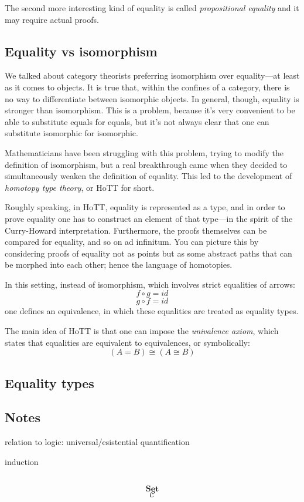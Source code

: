 \documentclass[DaoFP]{subfiles}
\begin{document}
The second more interesting kind of equality is called \emph{propositional equality} and it may require actual proofs. 

\subsection{Equality vs isomorphism}

We talked about category theorists preferring isomorphism over equality---at least as it comes to objects. It is true that, within the confines of a category, there is no way to differentiate between isomorphic objects. In general, though, equality is stronger than isomorphism. This is a problem, because it's very convenient to be able to substitute equals for equals, but it's not always clear that one can substitute isomorphic for isomorphic. 

Mathematicians have been struggling with this problem, trying to modify the definition of isomorphism, but a real breakthrough came when they decided to simultaneously weaken the definition of equality. This led to the development of \emph{homotopy type theory}, or HoTT for short. 

Roughly speaking, in HoTT, equality is represented as a type, and in order to prove equality one has to construct an element of that type---in the spirit of the Curry-Howard interpretation. Furthermore, the proofs themselves can be compared for equality, and so on ad infinitum. You can picture this by considering proofs of equality not as points but as some abstract paths that can be morphed into each other; hence the language of homotopies.

In this setting, instead of isomorphism, which involves strict equalities of arrows:
\[ f \circ g = id \]
\[ g \circ f = id \]
one defines an equivalence, in which these equalities are treated as equality types.

The main idea of HoTT is that one can impose the \emph{univalence axiom}, which states that equalities are equivalent to equivalences, or symbolically:
\[ (A = B) \cong (A \cong B) \]

\subsection{Equality types}

\subsection{Notes}


relation to logic: universal/esistential quantification


induction

\begin{exercise}
\end{exercise}

\begin{haskell}
\end{haskell}

\[
 \begin{tikzcd}
  \end{tikzcd}
\]

\[   \mathbf{Set} \]
\[   \mathcal{C} \]
\end{document}
